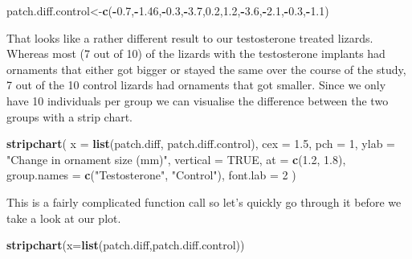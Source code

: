 \documentclass[
]{book}
\newenvironment{Shaded}{\begin{snugshade}}{\end{snugshade}}
\newcommand{\DataTypeTok}[1]{\textcolor[rgb]{0.13,0.29,0.53}{#1}}
\newcommand{\DecValTok}[1]{\textcolor[rgb]{0.00,0.00,0.81}{#1}}
\newcommand{\FloatTok}[1]{\textcolor[rgb]{0.00,0.00,0.81}{#1}}
\newcommand{\KeywordTok}[1]{\textcolor[rgb]{0.13,0.29,0.53}{\textbf{#1}}}
\newcommand{\NormalTok}[1]{#1}
\newcommand{\OperatorTok}[1]{\textcolor[rgb]{0.81,0.36,0.00}{\textbf{#1}}}
\newcommand{\OtherTok}[1]{\textcolor[rgb]{0.56,0.35,0.01}{#1}}
\newcommand{\StringTok}[1]{\textcolor[rgb]{0.31,0.60,0.02}{#1}}
\begin{document}
\begin{Shaded}
\begin{Highlighting}[]
\NormalTok{patch.diff.control<-}\KeywordTok{c}\NormalTok{(}\OperatorTok{-}\FloatTok{0.7}\NormalTok{,}\OperatorTok{-}\FloatTok{1.46}\NormalTok{,}\OperatorTok{-}\FloatTok{0.3}\NormalTok{,}\OperatorTok{-}\FloatTok{3.7}\NormalTok{,}\FloatTok{0.2}\NormalTok{,}\FloatTok{1.2}\NormalTok{,}\OperatorTok{-}\FloatTok{3.6}\NormalTok{,}\OperatorTok{-}\FloatTok{2.1}\NormalTok{,}\OperatorTok{-}\FloatTok{0.3}\NormalTok{,}\OperatorTok{-}\FloatTok{1.1}\NormalTok{)}
\end{Highlighting}
\end{Shaded}

That looks like a rather different result to our testosterone treated lizards. Whereas most (7 out of 10) of the lizards with the testosterone implants had ornaments that either got bigger or stayed the same over the course of the study, 7 out of the 10 control lizards had ornaments that got smaller. Since we only have 10 individuals per group we can visualise the difference between the two groups with a strip chart.

\begin{Shaded}
\begin{Highlighting}[]

\KeywordTok{stripchart}\NormalTok{(}
  \DataTypeTok{x =} \KeywordTok{list}\NormalTok{(patch.diff, patch.diff.control),}
  \DataTypeTok{cex =} \FloatTok{1.5}\NormalTok{,}
  \DataTypeTok{pch =} \DecValTok{1}\NormalTok{,}
  \DataTypeTok{ylab =} \StringTok{"Change in ornament size (mm)"}\NormalTok{,}
  \DataTypeTok{vertical =} \OtherTok{TRUE}\NormalTok{,}
  \DataTypeTok{at =} \KeywordTok{c}\NormalTok{(}\FloatTok{1.2}\NormalTok{, }\FloatTok{1.8}\NormalTok{),}
  \DataTypeTok{group.names =} \KeywordTok{c}\NormalTok{(}\StringTok{"Testosterone"}\NormalTok{, }\StringTok{"Control"}\NormalTok{),}
  \DataTypeTok{font.lab =} \DecValTok{2}
\NormalTok{)}
\end{Highlighting}
\end{Shaded}

This is a fairly complicated function call so let's quickly go through it before we take a look at our plot.

\begin{Shaded}
\begin{Highlighting}[]
\KeywordTok{stripchart}\NormalTok{(}\DataTypeTok{x=}\KeywordTok{list}\NormalTok{(patch.diff,patch.diff.control))}
\end{Highlighting}
\end{Shaded}
\end{document}
